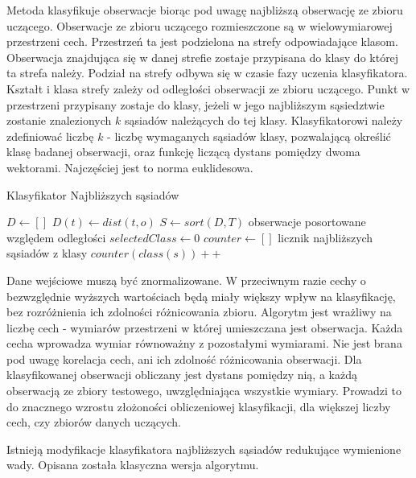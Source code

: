 \documentclass[a4paper,12pt,twoside,openany]{report}
\begin{document}
\begin{enumerate}
Metoda klasyfikuje obserwacje biorąc pod uwagę najbliższą obserwację ze zbioru uczącego.
Obserwacje ze zbioru uczącego rozmieszczone są w wielowymiarowej przestrzeni cech.
Przestrzeń ta jest podzielona na strefy odpowiadające klasom.
Obserwacja znajdująca się w danej strefie zostaje przypisana do klasy do której ta strefa należy.
Podział na strefy odbywa się w czasie fazy uczenia klasyfikatora.
Kształt i klasa strefy zależy od odległości obserwacji ze zbioru uczącego.
Punkt w przestrzeni przypisany zostaje do klasy, jeżeli w jego najbliższym sąsiedztwie zostanie znalezionych $k$ sąsiadów należących do tej klasy.
Klasyfikatorowi należy zdefiniować liczbę $k$ - liczbę wymaganych sąsiadów klasy, pozwalającą określić klasę badanej obserwacji, 
oraz funkcję liczącą dystans pomiędzy dwoma wektorami. Najczęściej jest to norma euklidesowa. \cite{Martin2011}

\begin{algorithm}
	\caption{Klasyfikator Najbliższych sąsiadów}
	\begin{algorithmic}[1]
		\State $D \leftarrow []$
		\State $D(t) \leftarrow dist(t, o)$
		\EndFor
		\State $S \leftarrow sort(D, T)$ \Comment obserwacje posortowane względem odległości
		\State $selectedClass \leftarrow 0$
		\State $counter \leftarrow []$ \Comment licznik najbliższych sąsiadów z klasy
		\Repeat
		\State $counter(class(s))++$
		\EndFor
		\EndProcedure
	\end{algorithmic}
\end{algorithm}

Dane wejściowe muszą być znormalizowane. 
W przeciwnym razie cechy o bezwzględnie wyższych wartościach będą miały większy wpływ na klasyfikację,
bez rozróżnienia ich zdolności różnicowania zbioru.
Algorytm jest wrażliwy na liczbę cech - wymiarów przestrzeni w której umieszczana jest obserwacja.
Każda cecha wprowadza wymiar równoważny z pozostałymi wymiarami. 
Nie jest brana pod uwagę korelacja cech, ani ich zdolność różnicowania obserwacji.
Dla klasyfikowanej obserwacji obliczany jest dystans pomiędzy nią,
a każdą obserwacją ze zbiory testowego, uwzględniająca wszystkie wymiary.
Prowadzi to do znacznego wzrostu złożoności obliczeniowej klasyfikacji, dla większej liczby cech, czy zbiorów danych uczących.

Istnieją modyfikacje klasyfikatora najbliższych sąsiadów redukujące wymienione wady. 
Opisana została klasyczna wersja algorytmu.


\end{enumerate}
\end{document}
